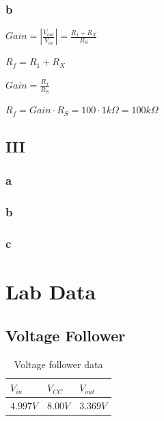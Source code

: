 \documentclass[10pt]{article}
\begin{document}
\subsubsection*{b}
{\doublespacing
\noindent $Gain = |\frac{V_{out}}{V_{in}}| = \frac{R_1+R_X}{R_S}$

\noindent $R_f = R_1 + R_X$

\noindent $Gain = \frac{R_f}{R_S}$

\noindent $R_f = Gain\cdot R_S = 100 \cdot 1k\Omega = 100k\Omega$}

\subsection*{III}
\subsubsection*{a}
\subsubsection*{b}
\subsubsection*{c}

\section*{Lab Data}
\subsection*{Voltage Follower}
\begin{table}[H]
	\centering
	\begin{tabular}{lll}
		\hline
		$V_{in}$ & $V_{CC}$ & $V_{out}$\\
		\hline
		$4.997V$ & $8.00V$ & $3.369V$\\
		\hline
	\end{tabular}
	\caption{Voltage follower data}
\end{table}
\end{document}
